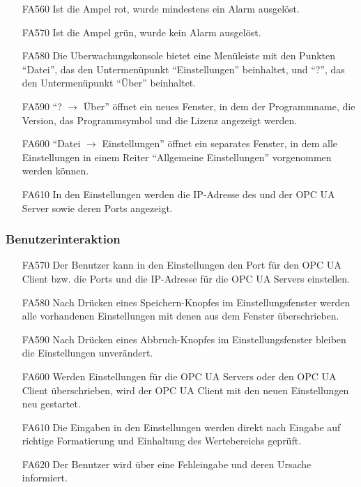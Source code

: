 \documentclass[parskip=full]{scrartcl}
\begin{document}
\begin{enumerate}
  \item[FA560] Ist die Ampel rot, wurde mindestens ein Alarm ausgelöst.
  \item[FA570] Ist die Ampel grün, wurde kein Alarm ausgelöst.
  \item[FA580] Die \gls{Uberwachungskonsole} bietet eine Menüleiste mit den Punkten "`Datei"', das den Untermenüpunkt "`Einstellungen"' beinhaltet, und "`?"', das den Untermenüpunkt "`Über"' beinhaltet.
  \item[FA590] "`? $\rightarrow$ Über"' öffnet ein neues Fenster, in dem der Programmname, die Version, das Programmsymbol und die Lizenz angezeigt werden.
  \item[FA600] "`Datei $\rightarrow$ Einstellungen"' öffnet ein separates Fenster, in dem alle Einstellungen in einem Reiter "`Allgemeine Einstellungen"' vorgenommen werden können.
  \item[FA610] In den Einstellungen werden die IP-Adresse des  und der \gls{OPC UA Server} sowie deren Ports angezeigt.
\end{enumerate}

\subsubsection{Benutzerinteraktion}
\begin{enumerate}
  \item[FA570] Der Benutzer kann in den Einstellungen den Port für den \gls{OPC UA Client} bzw. die Ports und die IP-Adresse für die \glspl{OPC UA Server} einstellen.
  \item[FA580] Nach Drücken eines Speichern-Knopfes im Einstellungsfenster werden alle vorhandenen Einstellungen mit denen aus dem Fenster überschrieben.
  \item[FA590] Nach Drücken eines Abbruch-Knopfes im Einstellungsfenster bleiben die Einstellungen unverändert.
  \item[FA600] Werden Einstellungen für die \glspl{OPC UA Server} oder den \gls{OPC UA Client} überschrieben, wird der \gls{OPC UA Client} mit den neuen Einstellungen neu gestartet.
  \item[FA610] Die Eingaben in den Einstellungen werden direkt nach Eingabe auf richtige Formatierung und Einhaltung des Wertebereichs gepr\"uft.
  \item[FA620] Der Benutzer wird über eine Fehleingabe und deren Ursache informiert.
\end{enumerate}
\end{document}
